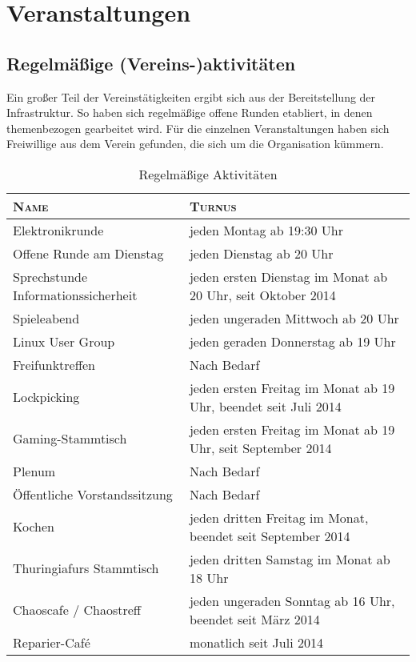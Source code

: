 \documentclass[ngerman]{scrartcl}
\begin{document}
\section{Veranstaltungen}

\subsection{Regelmäßige (Vereins-)aktivitäten}

Ein großer Teil der Vereinstätigkeiten ergibt sich aus der
Bereitstellung der Infrastruktur. So haben sich regelmäßige offene Runden
etabliert, in denen themenbezogen gearbeitet wird. Für die
einzelnen Veranstaltungen haben sich Freiwillige aus dem Verein
gefunden, die sich um die Organisation kümmern.

\begin{table}[h]
  \centering{}
	\begin{tabularx}{\textwidth}{l|X}
          \toprule
		\textsc{Name} & \textsc{Turnus} \\ \midrule
		Elektronikrunde & jeden Montag ab 19:30 Uhr\\
		Offene Runde am Dienstag & jeden Dienstag ab 20 Uhr\\
		Sprechstunde Informationssicherheit & jeden ersten Dienstag im Monat ab 20 Uhr, seit Oktober 2014\\ 
		Spieleabend & jeden ungeraden Mittwoch ab 20 Uhr\\
		Linux User Group & jeden geraden Donnerstag ab 19 Uhr\\
		Freifunktreffen & Nach Bedarf\\
		Lockpicking & jeden ersten Freitag im Monat ab 19 Uhr, beendet seit Juli 2014\\
		Gaming-Stammtisch & jeden ersten Freitag im Monat ab 19 Uhr, seit September 2014\\
                Plenum & Nach Bedarf\\
		Öffentliche Vorstandssitzung & Nach Bedarf\\
		Kochen & jeden dritten Freitag im Monat, beendet seit September 2014\\
		Thuringiafurs Stammtisch & jeden dritten Samstag im Monat ab 18 Uhr\\
		Chaoscafe / Chaostreff & jeden ungeraden Sonntag ab 16 Uhr, beendet seit März 2014\\
		Reparier-Café & monatlich seit Juli 2014\\
\bottomrule
\end{tabularx}
\caption{Regelmäßige Aktivitäten}
\end{table}
\end{document}
